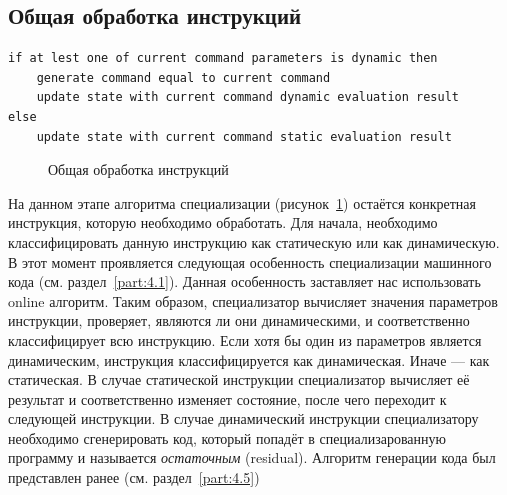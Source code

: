 \subsection{Общая обработка инструкций}
\newsavebox\boxminusone
\begin{lrbox}{\boxminusone}
\begin{lstlisting}[xleftmargin = 20pt]
if at lest one of current command parameters is dynamic then
    generate command equal to current command
    update state with current command dynamic evaluation result
else
    update state with current command static evaluation result
\end{lstlisting}
\end{lrbox}
\begin{figure}[!t]
\centering
\subfloat{\usebox\boxminusone}
\caption{Общая обработка инструкций\label{fig:handle}}
\end{figure}
На данном этапе алгоритма специализации (рисунок~\ref{fig:handle}) остаётся конкретная инструкция, которую необходимо обработать. Для начала, необходимо классифицировать данную инструкцию как статическую или как динамическую.
В этот момент проявляется следующая особенность специализации машинного кода (см. раздел~\ref{part:4.1}).
Данная особенность заставляет нас использовать online алгоритм. Таким образом, специализатор вычисляет значения параметров инструкции, проверяет, являются ли они динамическими, и соответственно классифицирует всю инструкцию. Если хотя бы один из параметров является динамическим, инструкция классифицируется как динамическая. Иначе --- как статическая.
В случае статической инструкции специализатор вычисляет её результат и соответственно изменяет состояние, после чего переходит к следующей инструкции.
В случае динамический инструкции специализатору необходимо сгенерировать код, который попадёт в специализарованную программу и называется
\emph{остаточным} (residual).
Алгоритм генерации кода был представлен ранее (см. раздел~\ref{part:4.5})

